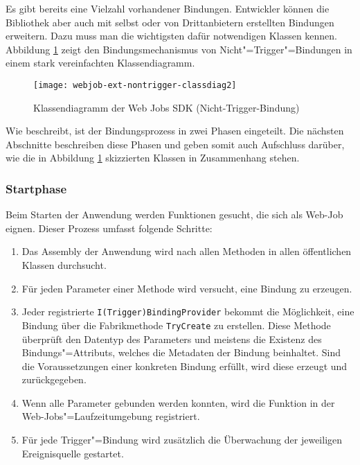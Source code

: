 Es gibt bereits eine Vielzahl vorhandener Bindungen. Entwickler können die Bibliothek aber auch mit selbst oder von Drittanbietern erstellten Bindungen erweitern. Dazu muss man die wichtigsten dafür notwendigen Klassen kennen. Abbildung \ref{fig:webjobsclassdiag} zeigt den Bindungsmechanismus von Nicht"=Trigger"=Bindungen in einem stark vereinfachten Klassendiagramm.

\begin{figure}[!hbt]%
\texttt{[image: webjob-ext-nontrigger-classdiag2]}%
\caption{Klassendiagramm der Web Jobs SDK (Nicht-Trigger-Bindung)}%
\label{fig:webjobsclassdiag}%
\end{figure}

Wie \cite{WebJobsSdkBindingProcess} beschreibt, ist der Bindungsprozess in zwei Phasen eingeteilt. Die nächsten Abschnitte beschreiben diese Phasen und geben somit auch Aufschluss darüber, wie die in Abbildung \ref{fig:webjobsclassdiag} skizzierten Klassen in Zusammenhang stehen.

\subsubsection{Startphase}

Beim Starten der Anwendung werden Funktionen gesucht, die sich als Web-Job eignen. Dieser Prozess umfasst folgende Schritte:

\begin{enumerate}
	\item Das Assembly der Anwendung wird nach allen Methoden in allen öffentlichen Klassen durchsucht.
	\item Für jeden Parameter einer Methode wird versucht, eine Bindung zu erzeugen.
	\item Jeder registrierte \lstinline{I(Trigger)BindingProvider} bekommt die Möglichkeit, eine Bindung über die Fabrikmethode \lstinline{TryCreate} zu erstellen. Diese Methode überprüft den Datentyp des Parameters und meistens die Existenz des Bindungs"=Attributs, welches die Metadaten der Bindung beinhaltet. Sind die Voraussetzungen einer konkreten Bindung erfüllt, wird diese erzeugt und zurückgegeben.
	\item Wenn alle Parameter gebunden werden konnten, wird die Funktion in der Web-Jobs"=Laufzeitumgebung registriert.
	\item Für jede Trigger"=Bindung wird zusätzlich die Überwachung der jeweiligen Ereignisquelle gestartet.
\end{enumerate}

